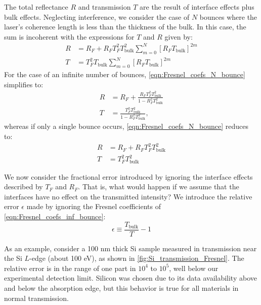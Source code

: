 The total reflectance $R$ and transmission $T$ are the result of interface effects plus bulk effects. Neglecting interference, we consider the case of $N$ bounces where the laser's coherence length is less than the thickness of the bulk. In this case, the sum is incoherent with the expressions for $T$ and $R$ given by:
\begin{equation}
\begin{aligned}
R &= R_F + R_F T_F^2 T_{\text{bulk}}^2 \sum_{m=0}^{N} \left[ R_F T_{\text{bulk}} \right]^{2m} \\
T &= T_F^2 T_{\text{bulk}} \sum_{m=0}^{N} \left[ R_F T_{\text{bulk}} \right]^{2m}
\end{aligned}
\label{eqn:Fresnel_coefs_N_bounce}
\end{equation}
For the case of an infinite number of bounces, \cref{eqn:Fresnel_coefs_N_bounce} simplifies to:
\begin{equation}
\begin{aligned}
R &= R_F + \frac{R_F T_F^2 T_{\text{bulk}}^2}{1-R_F^2 T_{\text{bulk}}^2} \\
T &= \frac{T_F^2 T_{\text{bulk}}^2}{1-R_F^2 T_{\text{bulk}}^2},
\end{aligned}
\label{eqn:Fresnel_coefs_inf_bounce}
\end{equation}
whereas if only a single bounce occurs, \cref{eqn:Fresnel_coefs_N_bounce} reduces to:
\begin{equation}
\begin{aligned}
R &= R_F + R_F T_F^2 T_{\text{bulk}}^2 \\
T &= T_F^2 T_{\text{bulk}}^2
\end{aligned}
\label{eqn:Fresnel_coefs_1_bounce}
\end{equation}

We now consider the fractional error introduced by ignoring the interface effects described by $T_F$ and $R_F$. That is, what would happen if we assume that the interfaces have no effect on the transmitted intensity? We introduce the relative error $\epsilon$ made by ignoring the Fresnel coefficients of \cref{eqn:Fresnel_coefs_inf_bounce}:
\begin{equation}
\epsilon \equiv \frac{T_{\text{bulk}}}{T} - 1
\label{eqn:Fresnel_rel_err}
\end{equation}

As an example, consider a 100 nm thick Si sample measured in transmission near the Si $L$-edge (about 100 eV), as shown in \cref{fig:Si_transmission_Fresnel}. The relative error is in the range of one part in $10^4$ to $10^5$, well below our experimental detection limit. Silicon was chosen due to its data availability above and below the absorption edge, but this behavior is true for all materials in normal transmission.

